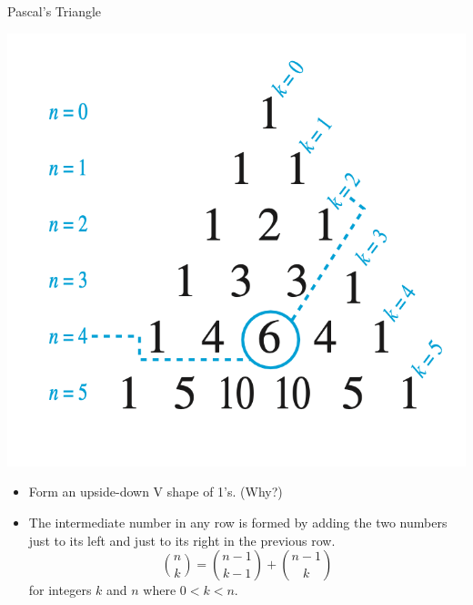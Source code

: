 \documentclass[10pt]{beamer}
\begin{document}
\begin{frame}{Pascal's Triangle}
\footnotesize 
\begin{minipage}{.5\textwidth}
\begin{center}
\end{center}
\end{minipage}
\hfill 
\begin{minipage}{.45\textwidth}
\begin{center}
\includegraphics[width=.95\textwidth]{images/pascals_triangle.png}
\end{center}
\end{minipage}

\begin{myredbox}[title=Algorithm for forming Pascal's Triangle]
\begin{itemize}
\item Form an upside-down V shape of 1's. (Why?)
\item The intermediate number in any row is formed by adding the two numbers just to its left and just to its right in the previous row.
\[ \binom{n}{k} =\binom{n-1}{k-1} + \binom{n-1}{k} \]
for integers $k$ and $n$ where $0 < k <n$.
\end{itemize}
\end{myredbox}



\end{frame}
\end{document}
